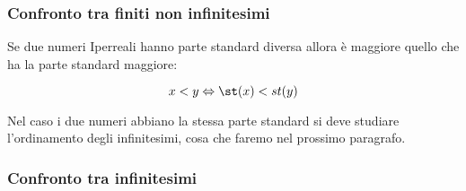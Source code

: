 \subsubsection{Confronto tra finiti non infinitesimi}
\label{subsubsec:insnum_confrontoreali}

Se due numeri Iperreali hanno parte standard diversa allora è maggiore quello 
che ha la parte standard maggiore:

\[x < y \Leftrightarrow \st(x) < st(y)\]

Nel caso i due numeri abbiano la stessa parte standard si deve studiare 
l'ordinamento degli infinitesimi, cosa che faremo nel prossimo paragrafo.

\subsubsection{Confronto tra infinitesimi}
\label{subsubsec:insnum_confrontoreali}

